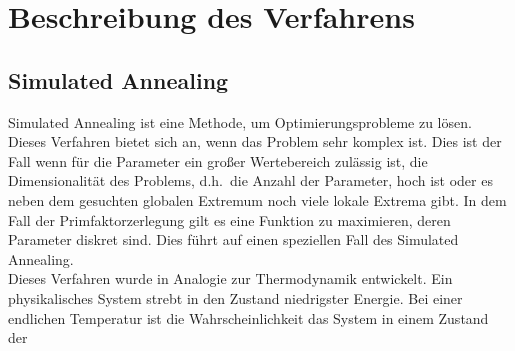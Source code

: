 \chapter{Beschreibung des Verfahrens}

\section{Simulated Annealing}
Simulated Annealing ist eine Methode, um Optimierungsprobleme zu lösen. Dieses Verfahren bietet sich an, wenn das Problem sehr komplex ist. Dies ist der Fall wenn für die Parameter ein großer Wertebereich zulässig ist, die Dimensionalität des Problems, d.h.\ die Anzahl der Parameter, hoch ist oder es neben dem gesuchten globalen Extremum noch viele lokale Extrema gibt. In dem Fall der Primfaktorzerlegung gilt es eine Funktion zu maximieren, deren Parameter diskret sind. Dies führt auf einen speziellen Fall des Simulated Annealing. \\
Dieses Verfahren wurde in Analogie zur Thermodynamik entwickelt. Ein physikalisches System strebt in den Zustand niedrigster Energie. Bei einer endlichen Temperatur ist die Wahrscheinlichkeit das System in einem Zustand der 

